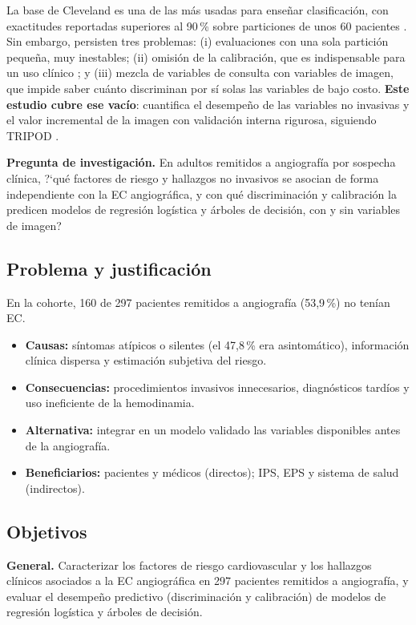 \documentclass[twocolumn,10pt]{article}
\begin{document}
La base de Cleveland es una de las m\'as usadas para ense\~nar clasificaci\'on, con exactitudes reportadas superiores al 90\,\% sobre particiones de unos 60 pacientes \cite{chandrasekhar2023}. Sin embargo, persisten tres problemas: (i) evaluaciones con una sola partici\'on peque\~na, muy inestables; (ii) omisi\'on de la calibraci\'on, que es indispensable para un uso cl\'inico \cite{vancalster2019}; y (iii) mezcla de variables de consulta con variables de imagen, que impide saber cu\'anto discriminan por s\'i solas las variables de bajo costo. \textbf{Este estudio cubre ese vac\'io}: cuantifica el desempe\~no de las variables no invasivas y el valor incremental de la imagen con validaci\'on interna rigurosa, siguiendo TRIPOD \cite{collins2015}.

\textbf{Pregunta de investigaci\'on.} En adultos remitidos a angiograf\'ia por sospecha cl\'inica, ?`qu\'e factores de riesgo y hallazgos no invasivos se asocian de forma independiente con la EC angiogr\'afica, y con qu\'e discriminaci\'on y calibraci\'on la predicen modelos de regresi\'on log\'istica y \'arboles de decisi\'on, con y sin variables de imagen?

\subsection{Problema y justificaci\'on}
En la cohorte, 160 de 297 pacientes remitidos a angiograf\'ia (53,9\,\%) no ten\'ian EC.
\begin{itemize}
\item \textbf{Causas:} s\'intomas at\'ipicos o silentes (el 47,8\,\% era asintom\'atico), informaci\'on cl\'inica dispersa y estimaci\'on subjetiva del riesgo.
\item \textbf{Consecuencias:} procedimientos invasivos innecesarios, diagn\'osticos tard\'ios y uso ineficiente de la hemodinamia.
\item \textbf{Alternativa:} integrar en un modelo validado las variables disponibles antes de la angiograf\'ia.
\item \textbf{Beneficiarios:} pacientes y m\'edicos (directos); IPS, EPS y sistema de salud (indirectos).
\end{itemize}

\subsection{Objetivos}
\textbf{General.} Caracterizar los factores de riesgo cardiovascular y los hallazgos cl\'inicos asociados a la EC angiogr\'afica en 297 pacientes remitidos a angiograf\'ia, y evaluar el desempe\~no predictivo (discriminaci\'on y calibraci\'on) de modelos de regresi\'on log\'istica y \'arboles de decisi\'on.
\end{document}
